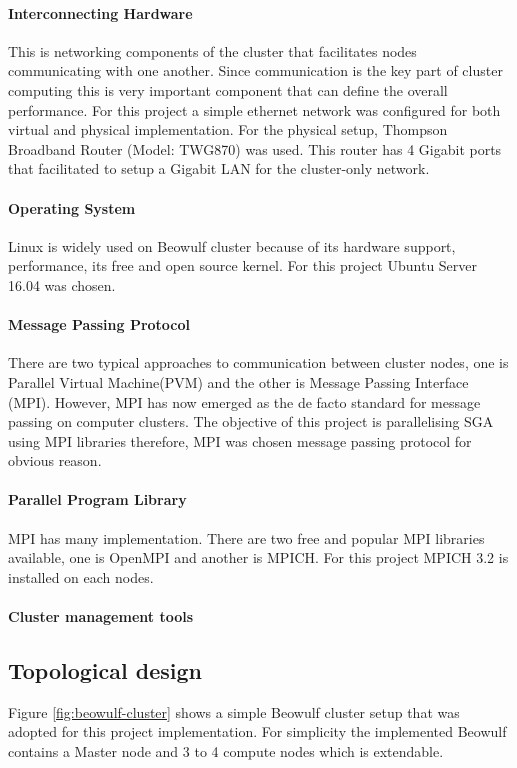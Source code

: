 \paragraph{Interconnecting Hardware}
This is networking components of the cluster that facilitates nodes communicating with one another. Since communication is the key part of cluster computing this is very important component that can define the overall performance. For this project a simple ethernet network was configured for both virtual and physical implementation. For the physical setup, Thompson Broadband Router (Model: TWG870) was used. This router has 4 Gigabit ports that facilitated to setup a Gigabit LAN for the cluster-only network.

\paragraph{Operating System}
Linux is widely used on Beowulf cluster because of its hardware support, performance, its free and open source kernel. For this project Ubuntu Server 16.04 was chosen.

\paragraph {Message Passing Protocol}
There are two typical approaches to communication between cluster nodes, one is  Parallel Virtual Machine(PVM) and the other is Message Passing Interface (MPI). However, MPI has now emerged as the de facto standard for message passing on computer clusters. The objective of this project is parallelising SGA using MPI libraries therefore, MPI was chosen message passing protocol for obvious reason.

\paragraph {Parallel Program Library}
MPI has many implementation. There are two free and popular MPI libraries available, one is OpenMPI and another is MPICH. For this project MPICH 3.2 is installed on each nodes. 

\paragraph {Cluster management tools}

\subsection{Topological design}
Figure \ref{fig:beowulf-cluster} shows a simple Beowulf cluster setup that was adopted for this project implementation. For simplicity the implemented Beowulf contains a Master node and 3 to 4 compute nodes which is extendable.

